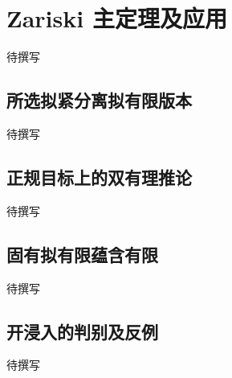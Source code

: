 
% 
% 

\section{Zariski 主定理及应用}
\label{g5:sec:1204}

待撰写

\subsection{所选拟紧分离拟有限版本}
\label{g5:subsec:1204:01}
待撰写

\subsection{正规目标上的双有理推论}
\label{g5:subsec:1204:02}
待撰写

\subsection{固有拟有限蕴含有限}
\label{g5:subsec:1204:03}
待撰写

\subsection{开浸入的判别及反例}
\label{g5:subsec:1204:04}
待撰写
